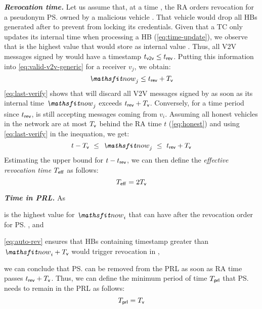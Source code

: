 \noindent\textbf{\emph{Revocation time.}}
%
Let us assume that, at a time \paramtrev{}, the \ac{RA} orders revocation for a
pseudonym \ps{} owned by a malicious vehicle . That vehicle would
drop all \acp{HB} generated after \paramtrev{} to prevent  from locking
its credentials. Given that a \ac{TC} only updates its internal time when
processing a \ac{HB} (\cref{eq:time-update}), we observe that \paramtrev{} is
the highest value that  would store as internal value \funcnow. Thus, all
\ac{V2V} messages signed by  would have a timestamp $\emph{$t_{\mathsf{v2v}}$}{}\leq
\emph{$t_{\mathsf{rev}}$}{}$. Putting this information into \cref{eq:valid-v2v-generic} for a
receiver $v_j$, we obtain:
%
\begin{equation}
    \label{eq:last-verify}
    \funcnow_j \leq \paramtrev{} + \paramtt{}
\end{equation}
%
\cref{eq:last-verify} shows that  will discard all \ac{V2V} messages
signed by  as soon as its internal time $\funcnow_j$ exceeds $\emph{$t_{\mathsf{rev}}$}{}
+ \emph{$T_{\mathsf{v}}$}{}$. Conversely, for a time period \paramtt{} since $\emph{$t_{\mathsf{rev}}$}$,
 is still accepting messages coming from $v_i$. Assuming all honest
vehicles in the network are at most $\emph{$T_{\mathsf{v}}$}$ behind the RA time $t$ (\cref{eq:honest}) and
using \cref{eq:last-verify} in the inequation, we get:
\begin{equation}
    \label{eq:estimate-teff}
    \paramtra{} - \paramtt{} \ \leq\ \funcnow_j\ \leq\  \paramtrev{} + \paramtt{}
\end{equation}
Estimating the upper bound for $\emph{$t$}{}-\emph{$t_{\mathsf{rev}}$}{}$, we can then define
the \emph{effective revocation time} $\emph{$T_{\mathsf{eff}}$}{}$ as follows:
%
\begin{equation}
    \label{eq:effective-revocation}
    \paramteff{} =  2\paramtt{}
\end{equation}
%

\noindent\textbf{\emph{Time in PRL.}}
%
As %
%
\begin{inparaenum}
    \item \paramtrev{} is the highest value for $\funcnow_i$ that  can
      have after the revocation order for \ps, and
    \item \cref{eq:auto-rev} ensures that \acp{HB} containing timestamp
      \paramthb{} greater than $\funcnow_i + \paramtt{}$ would trigger
      revocation in ,
\end{inparaenum}
%
we can conclude that \ps{} can be removed from the \ac{PRL} as soon as
\ac{RA} time \paramtra{} passes $\emph{$t_{\mathsf{rev}}$}{} + \emph{$T_{\mathsf{v}}$}{}$. Thus, we can
define the minimum period of time $\emph{$T_{\mathsf{prl}}$}$ that \ps{} needs to remain in
the \ac{PRL} as follows:
%
\begin{equation}
    \label{eq:t-prl}
    \paramtprl{} = \paramtt{}
\end{equation}

